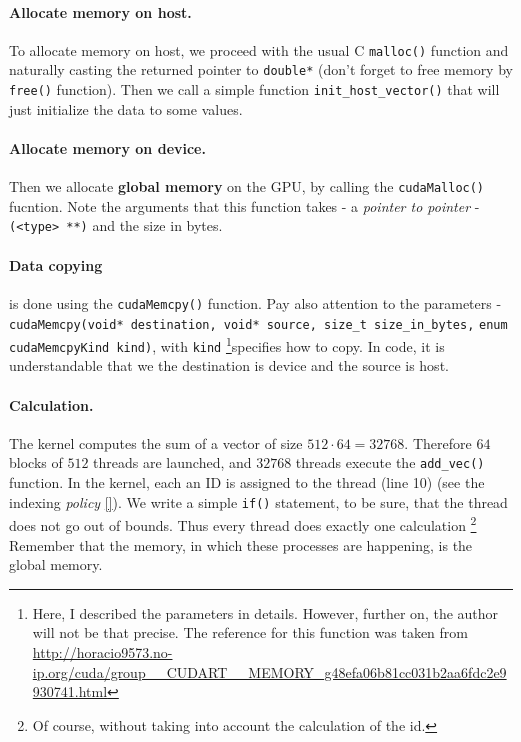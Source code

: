 \documentclass[12pt]{article}
\begin{document}
\paragraph{Allocate memory on host.} To allocate memory on host, 
we proceed with the usual C \verb|malloc()| function and naturally 
casting the returned pointer to \verb|double*| (don't forget 
to free memory by \verb|free()| function). 
Then we call a simple function \verb|init_host_vector()| that will just initialize the data 
to some values. 
\paragraph{Allocate memory on device.} Then we allocate \textbf{global memory} on the GPU, 
by calling the \verb|cudaMalloc()| fucntion. Note the arguments that this function takes - 
a \textit{pointer to pointer} - \verb|(<type> **)| and the size in bytes. 

\vspace{-0.8cm}
\paragraph{Data copying} is done using the \verb|cudaMemcpy()| function. Pay also attention 
to the parameters - 
\verb|cudaMemcpy(void* destination, void* source, size_t size_in_bytes,| \newline \verb|enum cudaMemcpyKind kind)|,
with \verb|kind| \footnote{Here, I described the parameters in details. However, further on,
the author will not be that precise. The reference for this function was taken from 
\url{http://horacio9573.no-ip.org/cuda/group__CUDART__MEMORY_g48efa06b81cc031b2aa6fdc2e9930741.html} }specifies how to copy. In code, it is understandable that we the destination is 
device and the source is host.

\vspace{-0.8cm}
\paragraph{Calculation.} The kernel computes the sum of a vector of size $512\cdot 64 = 32768$. 
Therefore $64$ blocks of $512$ threads are launched, and $32768$ threads execute the \verb|add_vec()|
function. In the kernel, each an ID is assigned to the thread (line 10) (see the indexing \textit{policy} \autoref{}). 
We write a simple \verb|if()| statement, to be sure, that the thread does not go out of bounds.
Thus every thread does exactly one calculation \footnote{Of course, without taking into account the calculation of the id.}
Remember that the memory, in which these processes are happening, is the global memory. 
\end{document}
